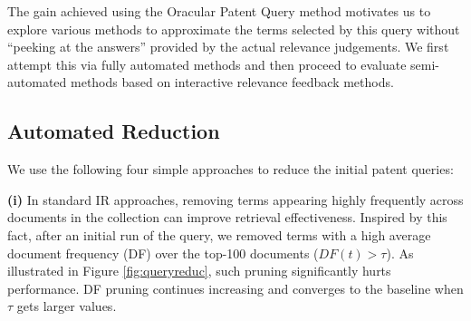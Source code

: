 The gain achieved using the Oracular Patent Query method motivates us to explore various methods to approximate the terms
selected by this query without ``peeking at the answers'' provided by
the actual relevance judgements.  We first attempt this via fully
automated methods and then proceed to evaluate semi-automated methods
based on interactive relevance feedback methods.

\subsection{Automated Reduction}
\label{sec:AutomatedReduction}
%
We use the following four simple approaches to reduce the initial patent queries: 

\vspace*{0.5mm}
\noindent \textbf{(i)} In standard IR approaches, removing terms appearing highly frequently across documents in the collection can improve retrieval effectiveness. Inspired by this fact, after an initial run of the query, we removed terms  with a high average document frequency (DF) over the top-100 documents ($\mathit{DF}(t)>\tau$). As illustrated in Figure \ref{fig:queryreduc}, such pruning significantly hurts performance. DF pruning continues increasing and converges to the baseline when $\tau $ gets larger values. 

